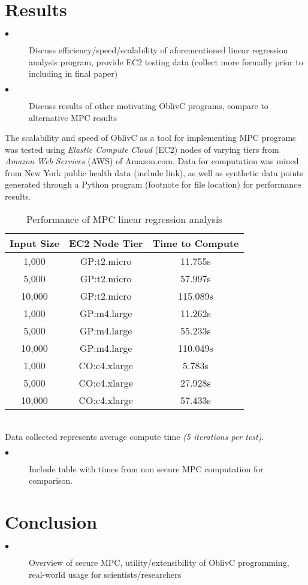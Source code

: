 \documentclass{article}
\begin{document}
\section{Results}
\begin{description}
\item[$\bullet$] Discuss efficiency/speed/scalability of aforementioned linear regression analysis program, provide EC2 testing data (collect more formally prior to including in final paper)
\item[$\bullet$] Discuss results of other motivating OblivC programs, compare to alternative MPC results
\end{description}

The scalability and speed of OblivC as a tool for implementing MPC programs was tested using \emph{Elastic Compute Cloud} (EC2) nodes of varying tiers from \emph{Amazon Web Services} (AWS) of Amazon.com\textregistered. Data for computation was mined from New York public health data (include link), as well as synthetic data points generated through a Python program (footnote for file location) for performance results.
\begin{table}[htb]
\caption{Performance of MPC linear regression analysis}
\centering

\begin{tabular}{| c | c | c |}
\hline Input Size & EC2 Node Tier & Time to Compute\\
\hline 1,000 & GP:t2.micro & 11.755s\\
\hline 5,000 & GP:t2.micro & 57.997s\\
\hline 10,000 & GP:t2.micro & 115.089s\\ 
\hline 1,000 & GP:m4.large & 11.262s\\ 
\hline 5,000 & GP:m4.large & 55.233s\\ 
\hline 10,000 & GP:m4.large & 110.049s\\
\hline 1,000 & CO:c4.xlarge & 5.783s\\
\hline 5,000 & CO:c4.xlarge & 27.928s\\
\hline 10,000 & CO:c4.xlarge & 57.433s\\
\hline
\end{tabular}
\end{table}
\\Data collected represents average compute time \emph{(5 iterations per test)}. 
\begin{description}
\item[$\bullet$] Include table with times from non secure MPC computation for comparison.
\end{description}
\section{Conclusion}
\begin{description}
\item[$\bullet$] Overview of secure MPC, utility/extensibility of OblivC programming, real-world usage for scientists/researchers
\end{description}
\end{document}
